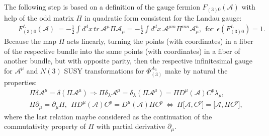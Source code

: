 \documentclass[10pt]{article}
\begin{document}
The following step is based on a definition of the gauge fermion $F_{(3)0}(\mathcal{A})$
with help of  the odd matrix $\Pi$ in quadratic form consistent for the Landau gauge:
\begin{eqnarray}
&& F^L_{(3)0}(\mathcal{A})\ =  -\frac{1}{2}\int d^d x \, tr\,   \mathcal{A}^{\mu}\Pi \mathcal{A}_\mu = - \frac{1}{2}\int d^d x \,   \mathcal{A}^{\mu m}\Pi^{mn} \mathcal{A}^n_\mu , \  \ \mathrm{for }\ \ \epsilon(F^L_{(3)0})=1. \label{N3gaugefap}
\end{eqnarray}
Because  the  map $\Pi$ acts  linearly, turning the points (with coordinates) in a fiber of the respective bundle into the same  points (with coordinates) in  a fiber of  another bundle, but with opposite parity, then the respective infinitesimal  gauge for $\mathcal{A}^\mu$ and $N(3)$ SUSY transformations for $\Phi^{A_3}_{(3)}$ make by natural the properties:
\begin{eqnarray}
  &&  \Pi \delta  \mathcal{A}^\mu =    \delta  (\Pi \mathcal{A}^\mu)  \Rightarrow \Pi \delta_{\lambda}  \mathcal{A}^\mu =    \delta_\lambda  (\Pi \mathcal{A}^\mu) =\Pi D^\mu (\mathcal{A})C^p\lambda_p, \label{piamu}   \\
&& \Pi \partial_\mu =  \partial_\mu\Pi, \  \ \Pi D^\mu (\mathcal{A})C^p =  D^\mu (\mathcal{A}) \Pi C^p \  \Leftrightarrow \  \Pi \big[\mathcal{A}, C^p\big] =  \big[\mathcal{A}, \Pi C^p\big], \label{piamu2}
\end{eqnarray}
where the last relation maybe considered as the continuation of the commutativity property of $\Pi$  with partial derivative $\partial_\mu$.
\end{document}
